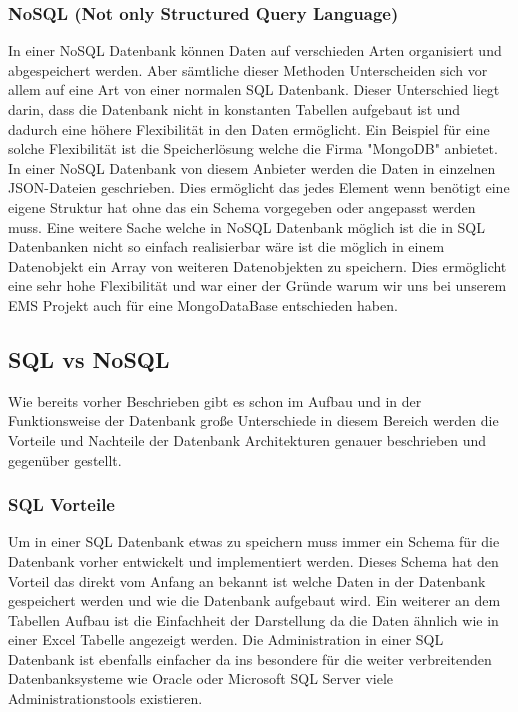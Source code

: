 	\subsubsection{NoSQL (Not only Structured Query Language)}	
	In einer NoSQL Datenbank können Daten auf verschieden Arten organisiert und abgespeichert werden. Aber sämtliche dieser Methoden Unterscheiden sich vor allem auf eine Art von einer normalen SQL Datenbank. Dieser Unterschied liegt darin, dass die Datenbank nicht in konstanten Tabellen aufgebaut ist und dadurch eine höhere Flexibilität in den Daten ermöglicht. Ein Beispiel für eine solche Flexibilität ist die Speicherlösung welche die Firma "MongoDB" anbietet. In einer NoSQL Datenbank von diesem Anbieter werden die Daten in einzelnen JSON-Dateien geschrieben. Dies ermöglicht das jedes Element wenn benötigt eine eigene Struktur hat ohne das ein Schema vorgegeben oder angepasst werden muss. Eine weitere Sache welche in NoSQL Datenbank möglich ist die in SQL Datenbanken nicht so einfach realisierbar wäre ist die möglich in einem Datenobjekt ein Array von weiteren Datenobjekten zu speichern. Dies ermöglicht eine sehr hohe Flexibilität und war einer der Gründe warum wir uns bei unserem EMS Projekt auch für eine MongoDataBase entschieden haben.
	
	\subsection{SQL vs NoSQL}
		Wie bereits vorher Beschrieben gibt es schon im Aufbau und in der Funktionsweise der Datenbank große Unterschiede in diesem Bereich werden die Vorteile und Nachteile der Datenbank Architekturen genauer beschrieben und gegenüber gestellt.
	
	\subsubsection{SQL Vorteile}
		Um in einer SQL Datenbank etwas zu speichern muss immer ein Schema für die Datenbank vorher entwickelt und implementiert werden. Dieses Schema hat den Vorteil das direkt vom Anfang an bekannt ist welche Daten in der Datenbank gespeichert werden und wie die Datenbank aufgebaut wird. 
		Ein weiterer an dem Tabellen Aufbau ist die Einfachheit der Darstellung da die Daten ähnlich wie in einer Excel Tabelle angezeigt werden. Die Administration in einer SQL Datenbank ist ebenfalls einfacher da ins besondere für die weiter verbreitenden Datenbanksysteme wie Oracle oder Microsoft SQL Server viele Administrationstools existieren.
		
